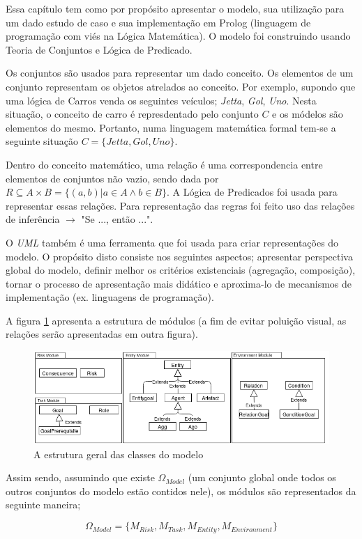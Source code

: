 Essa capítulo tem como por propósito apresentar o modelo, sua utilização para um dado estudo de caso e sua implementação 
em Prolog (linguagem de programação com viés na Lógica Matemática). O modelo foi construindo usando Teoria de Conjuntos
e Lógica de Predicado.

Os conjuntos são usados para representar um dado conceito. Os elementos de um conjunto representam os objetos atrelados ao 
conceito. Por exemplo, supondo que uma lógica de Carros venda os seguintes veículos; \textit{Jetta}, \textit{Gol}, \textit{Uno}.
Nesta situação, o conceito de carro é represdentado pelo conjunto $C$ e os módelos são elementos do mesmo. Portanto, numa linguagem
matemática formal tem-se a seguinte situação $C = \{Jetta,Gol,Uno\}$. 

Dentro do conceito matemático, uma relação é uma correspondencia entre elementos de conjuntos não vazio, sendo dada por
$R \subseteq  A \times B = \{(a,b)| a \in A \wedge b \in B \}$. A Lógica de Predicados foi usada para representar essas
relações. Para representação das regras foi feito uso das relações de inferência $\rightarrow$ "Se ..., então ...".  

O \textit{UML} também é uma ferramenta que foi usada para criar representações do modelo. O propósito disto consiste nos
seguintes aspectos; apresentar perspectiva global do modelo, definir melhor os critérios existenciais (agregação, composição),
tornar o processo de apresentação mais didático e aproxima-lo de mecanismos de implementação (ex. linguagens de programação). 

A figura \ref{module} apresenta a estrutura de módulos (a fim de evitar poluição visual, as relações serão apresentadas
em outra figura). 

\begin{figure}[H]
  \centering
  \includegraphics[width=1\linewidth]{figure/Class.png} 
  \caption{A estrutura geral das classes do modelo}
  \label{module}
\end{figure}

Assim sendo, assumindo que existe $\Omega_{Model}$ (um conjunto global onde todos os outros conjuntos do modelo estão 
contidos nele), os módulos são representados da seguinte maneira; 

\begin{equation} 
    \Omega_{Model} = \{ M_{Risk}, M_{Task}, M_{Entity}, M_{Environment}\}
\end{equation}
\label{modules}
